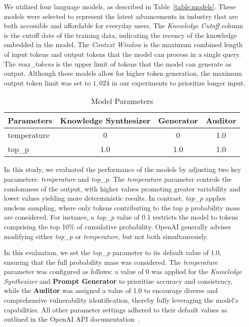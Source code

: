 We utilized four language models, as described in Table~\ref{table:models}. These models were selected to represent the latest advancements in industry that are both accessible and affordable for everyday users.
The \textit{Knowledge Cutoff} column is the cutoff date of the training data, indicating the recency of the knowledge embedded in the model.
The \textit{Context Window} is the maximum combined length of input tokens and output tokens that the model can process in a single query.
The \textit{max\_tokens} is the upper limit of tokens that the model can generate as output. 
Although these models allow for higher token generation, the maximum output token limit was set to $1,024$ in our experiments to prioritize longer input.

\begin{table}[]
\caption{Model Parameters}
\label{table:modelparams}
\begin{tabular}{@{}lccc@{}}
\toprule
Parameters  & Knowledge Synthesizer & Generator & Auditor \\ \midrule
temperature & 0                     & 0         & 1.0     \\
top\_p      & 1.0                   & 1.0       & 1.0     \\ \bottomrule
\end{tabular}
\end{table}

In this study, we evaluated the performance of the models by adjusting two key parameters: \textit{temperature} and \textit{top\_p}. The \textit{temperature} parameter controls the randomness of the output, with higher values promoting greater variability and lower values yielding more deterministic results. In contrast, \textit{top\_p} applies nucleus sampling, where only tokens contributing to the top \textit{p} probability mass are considered. For instance, a \textit{top\_p} value of 0.1 restricts the model to tokens comprising the top 10\% of cumulative probability. OpenAI generally advises modifying either \textit{top\_p} or \textit{temperature}, but not both simultaneously.

In this evaluation, we set the \textit{top\_p} parameter to its default value of 1.0, ensuring that the full probability mass was considered. The \textit{temperature} parameter was configured as follows: a value of 0 was applied for the \textit{Knowledge Synthesizer} and \textbf{Prompt Generator} to prioritize accuracy and consistency, while the \textbf{Auditor} was assigned a value of 1.0 to encourage diverse and comprehensive vulnerability identification, thereby fully leveraging the model’s capabilities. All other parameter settings adhered to their default values as outlined in the OpenAI API documentation~\cite{openaiparams}.

